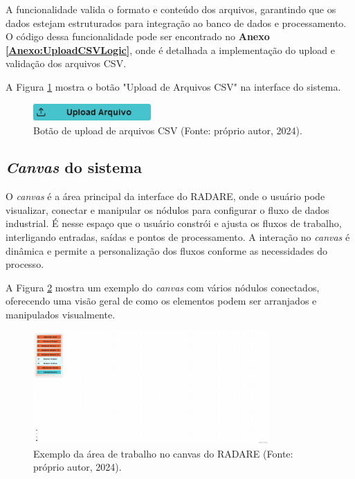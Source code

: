 A funcionalidade valida o formato e conteúdo dos arquivos, garantindo que os dados estejam estruturados para integração ao banco de dados e processamento. O código dessa funcionalidade pode ser encontrado no \textbf{Anexo \ref{Anexo:UploadCSVLogic}}, onde é detalhada a implementação do upload e validação dos arquivos CSV.

A Figura \ref{Fig:UploadCSVButton} mostra o botão "Upload de Arquivos CSV" na interface do sistema.

\begin{figure}[htbp]
    \centering
    \includegraphics[width=0.4\textwidth]{figuras/upload-csv-button.png}
    \caption{Botão de upload de arquivos CSV (Fonte: próprio autor, 2024).}
    \label{Fig:UploadCSVButton}
\end{figure}

\subsection{\textit{Canvas} do sistema}

O \textit{canvas} é a área principal da interface do RADARE, onde o usuário pode visualizar, conectar e manipular os nódulos para configurar o fluxo de dados industrial. É nesse espaço que o usuário constrói e ajusta os fluxos de trabalho, interligando entradas, saídas e pontos de processamento. A interação no \textit{canvas} é dinâmica e permite a personalização dos fluxos conforme as necessidades do processo.

A Figura \ref{Fig:EmptyCanvas} mostra um exemplo do \textit{canvas} com vários nódulos conectados, oferecendo uma visão geral de como os elementos podem ser arranjados e manipulados visualmente.

\begin{figure}[htbp]
    \centering
    \includegraphics[width=0.8\textwidth]{figuras/empty-canvas.png}
    \caption{Exemplo da área de trabalho no canvas do RADARE (Fonte: próprio autor, 2024).}
    \label{Fig:EmptyCanvas}
\end{figure}

